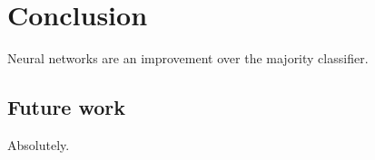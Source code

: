 \chapter{Conclusion}

Neural networks are an improvement over the majority classifier.


\section{Future work}

Absolutely.
